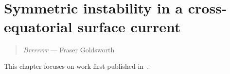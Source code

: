 \chapter{Symmetric instability in a cross-equatorial surface current}
\begin{quote}
    \textit{Brrrrrrr} --- Fraser Goldsworth
\end{quote}

This chapter focuses on work first published in~\citet{Goldsworth2021}.